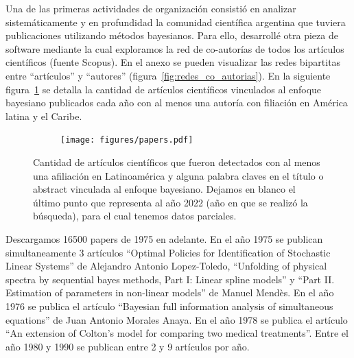 \documentclass[a4paper,11pt]{book}
\theoremstyle{definition}
\begin{document}

Una de las primeras actividades de organizaci\'on consisti\'o en analizar sistem\'aticamente y en profundidad la comunidad cient\'ifica argentina que tuviera publicaciones utilizando m\'etodos bayesianos.
%
Para ello, desarroll\'e otra pieza de software mediante la cual exploramos la red de co-autor\'ias de todos los art\'iculos cient\'ificos (fuente Scopus).
%
En el anexo se pueden visualizar las redes bipartitas entre ``art\'iculos'' y ``autores'' (figura~\ref{fig:redes_co_autorias}).
%
En la siguiente figura~\ref{fig:papers_bayesianos} se detalla la cantidad de art\'iculos cient\'ificos vinculados al enfoque bayesiano publicados cada a\~no con al menos una autor\'ia con filiaci\'on en Am\'erica latina y el Caribe.


\begin{figure}[ht!]
\centering
  \begin{subfigure}[b]{0.60\textwidth}
  \texttt{[image: figures/papers.pdf]}
  \end{subfigure}
  \caption{Cantidad de art\'iculos cient\'ificos que fueron detectados con al menos una afiliaci\'on en Latinoam\'erica y alguna palabra claves en el t\'itulo o abstract vinculada al enfoque bayesiano. Dejamos en blanco el \'ultimo punto que representa al a\~no 2022 (a\~no en que se realiz\'o la b\'usqueda), para el cual tenemos datos parciales.}
  \label{fig:papers_bayesianos}
\end{figure}


Descargamos 16500 papers de 1975 en adelante.
%
En el a\~no 1975 se publican simultaneamente 3 art\'iculos ``Optimal Policies for Identification of Stochastic Linear Systems'' de Alejandro Antonio Lopez-Toledo, ``Unfolding of physical spectra by sequential bayes methods, Part I: Linear spline models'' y ``Part II. Estimation of parameters in non-linear models'' de Manuel Mend\`es.
%
En el a\~no 1976 se publica el art\'iculo ``Bayesian full information analysis of simultaneous equations'' de Juan Antonio Morales Anaya.
%
En el a\~no 1978 se publica el art\'iculo ``An extension of Colton's model for comparing two medical treatments''.
%
Entre el a\~no 1980 y 1990 se publican entre 2 y 9 art\'iculos por a\~no.

\end{document}
